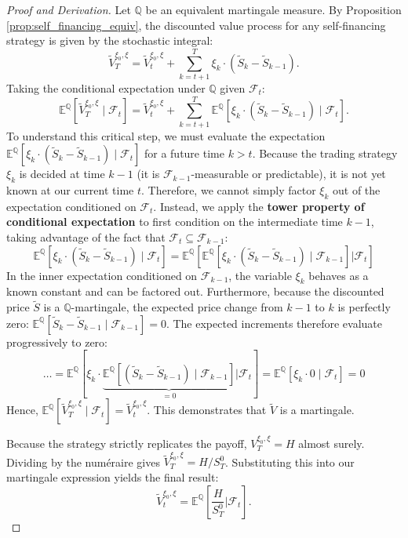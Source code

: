 \begin{proof}[Proof and Derivation]
    Let $\mathbb{Q}$ be an equivalent martingale measure. By Proposition \ref{prop:self_financing_equiv}, the discounted value process for any self-financing strategy is given by the stochastic integral:
    $$ \tilde{V}_T^{\xi_0, \xi} = \tilde{V}_t^{\xi_0, \xi} + \sum_{k=t+1}^T \xi_k \cdot (\tilde{S}_k - \tilde{S}_{k-1}). $$
    Taking the conditional expectation under $\mathbb{Q}$ given $\mathcal{F}_t$:
    $$ \mathbb{E}^{\mathbb{Q}}\left[ \tilde{V}_T^{\xi_0, \xi} \mid \mathcal{F}_t \right] = \tilde{V}_t^{\xi_0, \xi} + \sum_{k=t+1}^T \mathbb{E}^{\mathbb{Q}}\left[ \xi_k \cdot (\tilde{S}_k - \tilde{S}_{k-1}) \mid \mathcal{F}_t \right]. $$
    To understand this critical step, we must evaluate the expectation $\mathbb{E}^{\mathbb{Q}}\left[ \xi_k \cdot (\tilde{S}_k - \tilde{S}_{k-1}) \mid \mathcal{F}_t \right]$ for a future time $k > t$.
    Because the trading strategy $\xi_k$ is decided at time $k-1$ (it is $\mathcal{F}_{k-1}$-measurable or predictable), it is not yet known at our current time $t$. Therefore, we cannot simply factor $\xi_k$ out of the expectation conditioned on $\mathcal{F}_t$.
    Instead, we apply the \textbf{tower property of conditional expectation} to first condition on the intermediate time $k-1$, taking advantage of the fact that $\mathcal{F}_t \subseteq \mathcal{F}_{k-1}$:
    $$ \mathbb{E}^{\mathbb{Q}}\left[ \xi_k \cdot (\tilde{S}_k - \tilde{S}_{k-1}) \mid \mathcal{F}_t \right] = \mathbb{E}^{\mathbb{Q}}\left[ \mathbb{E}^{\mathbb{Q}}\left[ \xi_k \cdot (\tilde{S}_k - \tilde{S}_{k-1}) \mid \mathcal{F}_{k-1} \right] \mathrel{\Big|} \mathcal{F}_t \right] $$
    In the inner expectation conditioned on $\mathcal{F}_{k-1}$, the variable $\xi_k$ behaves as a known constant and can be factored out. Furthermore, because the discounted price $\tilde{S}$ is a $\mathbb{Q}$-martingale, the expected price change from $k-1$ to $k$ is perfectly zero: $\mathbb{E}^{\mathbb{Q}}\left[ \tilde{S}_k - \tilde{S}_{k-1} \mid \mathcal{F}_{k-1} \right] = 0$.
    The expected increments therefore evaluate progressively to zero:
    $$ \dots = \mathbb{E}^{\mathbb{Q}}\left[ \xi_k \cdot \underbrace{\mathbb{E}^{\mathbb{Q}}\left[ (\tilde{S}_k - \tilde{S}_{k-1}) \mid \mathcal{F}_{k-1} \right]}_{= 0} \mathrel{\Big|} \mathcal{F}_t \right] = \mathbb{E}^{\mathbb{Q}}[ \xi_k \cdot 0 \mid \mathcal{F}_t ] = 0 $$
    Hence, $\mathbb{E}^{\mathbb{Q}}\left[ \tilde{V}_T^{\xi_0, \xi} \mid \mathcal{F}_t \right] = \tilde{V}_t^{\xi_0, \xi}$. This demonstrates that $\tilde{V}$ is a martingale.

    Because the strategy strictly replicates the payoff, $V_T^{\xi_0, \xi} = H$ almost surely. Dividing by the numéraire gives $\tilde{V}_T^{\xi_0, \xi} = H / S_T^0$. Substituting this into our martingale expression yields the final result:
    $$ \tilde{V}_t^{\xi_0, \xi} = \mathbb{E}^{\mathbb{Q}} \left[ \frac{H}{S_T^0} \mathrel{\Big|} \mathcal{F}_t \right]. $$
\end{proof}

